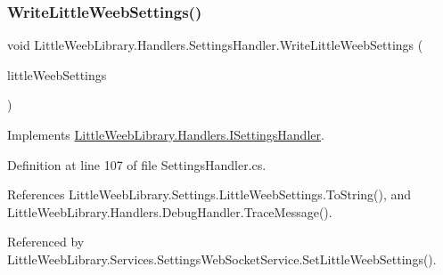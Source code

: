 \mbox{\label{class_little_weeb_library_1_1_handlers_1_1_settings_handler_af5a1ea4a3605d938b363e83268774d6f}} 
\subsubsection{\texorpdfstring{Write\+Little\+Weeb\+Settings()}{WriteLittleWeebSettings()}}
{\footnotesize\ttfamily void Little\+Weeb\+Library.\+Handlers.\+Settings\+Handler.\+Write\+Little\+Weeb\+Settings (\begin{DoxyParamCaption}\item[{\mbox{\hyperlink{class_little_weeb_library_1_1_settings_1_1_little_weeb_settings}{Little\+Weeb\+Settings}}}]{little\+Weeb\+Settings }\end{DoxyParamCaption})}



Implements \mbox{\hyperlink{interface_little_weeb_library_1_1_handlers_1_1_i_settings_handler_a6b2cfe838785ae84db9608fb041c5fb5}{Little\+Weeb\+Library.\+Handlers.\+I\+Settings\+Handler}}.



Definition at line 107 of file Settings\+Handler.\+cs.



References Little\+Weeb\+Library.\+Settings.\+Little\+Weeb\+Settings.\+To\+String(), and Little\+Weeb\+Library.\+Handlers.\+Debug\+Handler.\+Trace\+Message().



Referenced by Little\+Weeb\+Library.\+Services.\+Settings\+Web\+Socket\+Service.\+Set\+Little\+Weeb\+Settings().



